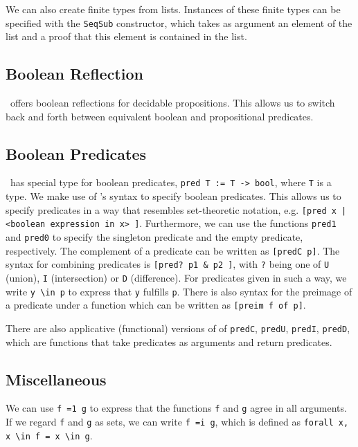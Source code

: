 We can also create finite types from lists.
Instances of these finite types can be specified with the \lstinline{SeqSub} constructor, 
which takes as argument an element of the list and a proof that this element is contained in the list.


\subsection{Boolean Reflection}
\ssreflect\ offers boolean reflections for decidable propositions. 
This allows us to switch back and forth between equivalent boolean and propositional predicates.

\subsection{Boolean Predicates}
\ssreflect\ has special type for boolean predicates, \lstinline{pred T := T -> bool}, where \lstinline{T} is a type.
We make use of \ssreflect's syntax to specify boolean predicates.
This allows us to specify predicates in a way that resembles set-theoretic notation, e.g. 
\lstinline{[pred x | <boolean expression in x> ]}.
Furthermore, we can use the functions \lstinline{pred1} and \lstinline{pred0} to specify the singleton predicate and the empty predicate, respectively.
The complement of a predicate can be written as \lstinline{[predC p]}. 
The syntax for combining predicates is \lstinline{[pred? p1 & p2 ]}, with \lstinline{?} being one of 
\lstinline{U} (union), \lstinline{I} (intersection) or \lstinline{D} (difference).
For predicates given in such a way, we write \lstinline{y \in p} to express that \lstinline{y} fulfills \lstinline{p}.
There is also syntax for the preimage of a predicate under a function
which can be written as \lstinline{[preim f of p]}.



There are also applicative (functional) versions of of \lstinline{predC}, \lstinline{predU}, \lstinline{predI}, \lstinline{predD}, 
which are functions that take predicates as arguments and return predicates.

\subsection{Miscellaneous}
We can use \lstinline{f =1 g} to express that the functions \lstinline{f} and \lstinline{g} agree in all arguments.
If we regard \lstinline{f} and \lstinline{g} as sets, we can write \lstinline{f =i g}, which is defined as \lstinline{forall x, x \in f = x \in g}.




